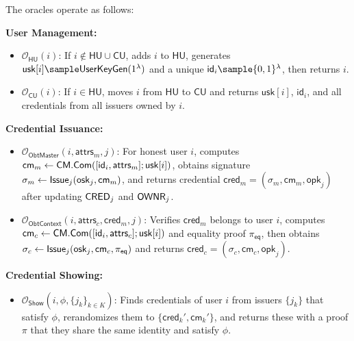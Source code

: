 \noindent The oracles operate as follows:

\noindent \textbf{User Management:}
\begin{itemize}
    \item $\mathcal{O}_{\mathsf{HU}}(i)$: If $i \notin \mathsf{HU} \cup \mathsf{CU}$, adds $i$ to $\mathsf{HU}$, generates $\mathsf{usk}[i] \sample \UserKeyGen(1^\lambda)$ and a unique $\mathsf{id}_i \sample \{0,1\}^\lambda$, then returns $i$.
    
    \item $\mathcal{O}_{\mathsf{CU}}(i)$: If $i \in \mathsf{HU}$, moves $i$ from $\mathsf{HU}$ to $\mathsf{CU}$ and returns $\mathsf{usk}[i]$, $\mathsf{id}_i$, and all credentials from all issuers owned by $i$.
\end{itemize}

\noindent \textbf{Credential Issuance:}
\begin{itemize}
    \item $\mathcal{O}_{\mathsf{ObtMaster}}(i, \mathsf{attrs}_m, j)$: For honest user $i$, computes $\mathsf{cm}_m \gets \mathsf{CM.Com}([\mathsf{id}_i, \mathsf{attrs}_m]; \mathsf{usk}[i])$, obtains signature $\sigma_m \gets \mathsf{Issue}_j(\mathsf{osk}_j, \mathsf{cm}_m)$, and returns credential $\mathsf{cred}_m = (\sigma_m, \mathsf{cm}_m, \mathsf{opk}_j)$ after updating $\mathsf{CRED}_j$ and $\mathsf{OWNR}_j$.
    
    \item $\mathcal{O}_{\mathsf{ObtContext}}(i, \mathsf{attrs}_c, \mathsf{cred}_m, j)$: Verifies $\mathsf{cred}_m$ belongs to user $i$, computes $\mathsf{cm}_c \gets \mathsf{CM.Com}([\mathsf{id}_i, \mathsf{attrs}_c]; \mathsf{usk}[i])$ and equality proof $\pi_{\mathsf{eq}}$, then obtains $\sigma_c \gets \mathsf{Issue}_j(\mathsf{osk}_j, \mathsf{cm}_c, \pi_{\mathsf{eq}})$ and returns $\mathsf{cred}_c = (\sigma_c, \mathsf{cm}_c, \mathsf{opk}_j)$.
\end{itemize}

\noindent \textbf{Credential Showing:}
\begin{itemize}
    \item $\mathcal{O}_{\mathsf{Show}}(i, \phi, \{j_k\}_{k \in K})$: Finds credentials of user $i$ from issuers $\{j_k\}$ that satisfy $\phi$, rerandomizes them to $\{\mathsf{cred}_k', \mathsf{cm}_k'\}$, and returns these with a proof $\pi$ that they share the same identity and satisfy $\phi$.
\end{itemize}








































